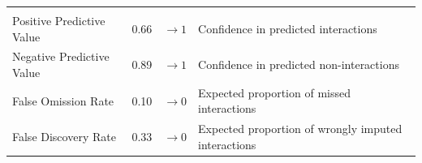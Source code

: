 \documentclass[10pt,oneside]{article}
\begin{document}
\begin{longtable}[]{@{}llll@{}}
\begin{minipage}[t]{0.49\columnwidth}
\strut
\end{minipage}\tabularnewline
\begin{minipage}[t]{0.21\columnwidth}\raggedright
Positive Predictive Value\strut
\end{minipage} & \begin{minipage}[t]{0.05\columnwidth}\raggedright
0.66\strut
\end{minipage} & \begin{minipage}[t]{0.13\columnwidth}\raggedright
\(\rightarrow 1\)\strut
\end{minipage} & \begin{minipage}[t]{0.49\columnwidth}\raggedright
Confidence in predicted interactions\strut
\end{minipage}\tabularnewline
\begin{minipage}[t]{0.21\columnwidth}\raggedright
Negative Predictive Value\strut
\end{minipage} & \begin{minipage}[t]{0.05\columnwidth}\raggedright
0.89\strut
\end{minipage} & \begin{minipage}[t]{0.13\columnwidth}\raggedright
\(\rightarrow 1\)\strut
\end{minipage} & \begin{minipage}[t]{0.49\columnwidth}\raggedright
Confidence in predicted non-interactions\strut
\end{minipage}\tabularnewline
\begin{minipage}[t]{0.21\columnwidth}\raggedright
False Omission Rate\strut
\end{minipage} & \begin{minipage}[t]{0.05\columnwidth}\raggedright
0.10\strut
\end{minipage} & \begin{minipage}[t]{0.13\columnwidth}\raggedright
\(\rightarrow 0\)\strut
\end{minipage} & \begin{minipage}[t]{0.49\columnwidth}\raggedright
Expected proportion of missed interactions\strut
\end{minipage}\tabularnewline
\begin{minipage}[t]{0.21\columnwidth}\raggedright
False Discovery Rate\strut
\end{minipage} & \begin{minipage}[t]{0.05\columnwidth}\raggedright
0.33\strut
\end{minipage} & \begin{minipage}[t]{0.13\columnwidth}\raggedright
\(\rightarrow 0\)\strut
\end{minipage} & \begin{minipage}[t]{0.49\columnwidth}\raggedright
Expected proportion of wrongly imputed interactions\strut
\end{minipage}\tabularnewline
\bottomrule
\end{longtable}
\end{document}
